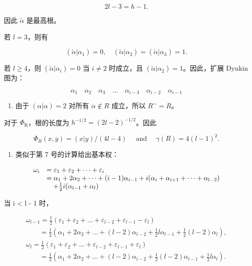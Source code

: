 \[
2 l - 3 = h - 1.
\]

因此 \(\tilde{\alpha}\) 是最高根。

若 \(l = 3\)，则有

\[
(\tilde {\alpha} | \alpha_ {1}) = 0, \quad (\tilde {\alpha} | \alpha_ {2}) = (\tilde {\alpha} | \alpha_ {3}) = 1.
\]

若 \(l \geqslant 4\)，则 \((\tilde{\alpha}|\alpha_i) = 0\) 当 \(i \neq 2\) 时成立，且 \((\tilde{\alpha}|\alpha_2) = 1\)。因此，扩展 Dynkin 图为：

\[
\alpha_ {1} \quad \alpha_ {2} \quad \alpha_ {3} \quad \dots \quad \alpha_ {i - 3} \quad \alpha_ {i - 2} \quad \alpha_ {i - 1}
\]

\begin{enumerate}
\def\labelenumi{(\Alph{enumi})}
\setcounter{enumi}{21}
\tightlist
\item
  由于 \((\alpha |\alpha) = 2\) 对所有 \(\alpha \notin R\) 成立，所以 \(R^{\sim} = R\)。
\end{enumerate}

对于 \(\Phi_{\mathrm{R}}\)，根的长度为 \(h^{-1 / 2} = (2l - 2)^{-1 / 2}\)。因此

\[
\Phi_ {R} (x, y) = (x | y) / (4 l - 4) \quad \text { and } \quad \gamma (R) = 4 (l - 1) ^ {2}.
\]

\begin{enumerate}
\def\labelenumi{(\Roman{enumi})}
\setcounter{enumi}{5}
\tightlist
\item
  类似于第 7 号的计算给出基本权：
\end{enumerate}

\[
\begin{array}{r l} \omega_ {i} & = \varepsilon_ {1} + \varepsilon_ {2} + \dots + \varepsilon_ {i} \\ & = \alpha_ {1} + 2 \alpha_ {2} + \dots + (i - 1) \alpha_ {i - 1} + i (\alpha_ {i} + \alpha_ {i + 1} + \dots + \alpha_ {l - 2}) \\ & \quad + \frac {1}{2} i (\alpha_ {l - 1} + \alpha_ {l}) \end{array}
\]

当 i \textless{} l - 1 时，

\[
\begin{array}{l} \omega_ {l - 1} = \frac {1}{2} (\varepsilon_ {1} + \varepsilon_ {2} + \dots + \varepsilon_ {l - 2} + \varepsilon_ {l - 1} - \varepsilon_ {l}) \\ \qquad = \frac {1}{2} (\alpha_ {1} + 2 \alpha_ {2} + \dots + (l - 2) \alpha_ {l - 2} + \frac {1}{2} l \alpha_ {l - 1} + \frac {1}{2} (l - 2) \alpha_ {l}), \\ \omega_ {l} = \frac {1}{2} (\varepsilon_ {1} + \varepsilon_ {2} + \dots + \varepsilon_ {l - 2} + \varepsilon_ {l - 1} + \varepsilon_ {l}) \\ \qquad = \frac {1}{2} (\alpha_ {1} + 2 \alpha_ {2} + \dots + (l - 2) \alpha_ {l - 2} + \frac {1}{2} (l - 2) \alpha_ {l - 1} + \frac {1}{2} l \alpha_ {l}). \end{array}
\]

